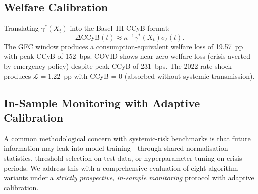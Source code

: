 \documentclass[final]{siamltex}
\begin{document}
\subsection{Welfare Calibration}

Translating $\gamma^*(X_t)$ into the Basel~III CCyB format:
\begin{equation}\label{eq:ccyb}
  \Delta\mathrm{CCyB}(t)\approx
  \kappa^{-1}\gamma^*(X_t)\sigma_\ell(t).
\end{equation}
The GFC window produces a consumption-equivalent welfare loss of
19.57~pp with peak CCyB of 152~bps. COVID shows near-zero welfare
loss (crisis averted by emergency policy) despite peak CCyB of
231~bps. The 2022 rate shock produces $\mathcal{L}=1.22$~pp with
CCyB = 0 (absorbed without systemic transmission).

\subsection{In-Sample Monitoring with Adaptive Calibration}\label{sec:noleakage}

A common methodological concern with systemic-risk benchmarks is
that future information may leak into model training---through
shared normalisation statistics, threshold selection on test data,
or hyperparameter tuning on crisis periods.  We address this with
a comprehensive evaluation of eight algorithm variants under a
\emph{strictly prospective, in-sample monitoring} protocol with
adaptive calibration.
\end{document}
